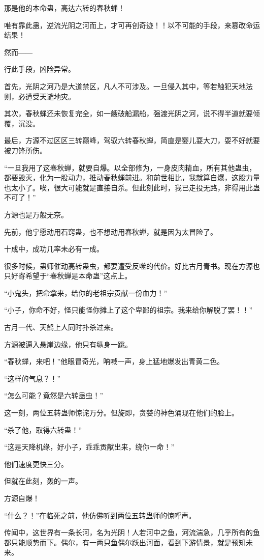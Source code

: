 \begin{this_body}
那是他的本命蛊，高达六转的春秋蝉！

唯有靠此蛊，逆流光阴之河而上，才可再创奇迹！！以不可能的手段，来篡改命运结果！

然而――

行此手段，凶险异常。

首先，光阴之河乃是大道禁区，凡人不可涉及。一旦侵入其中，等若触犯天地法则，必遭受天谴地灾。

其次，春秋蝉还未恢复完全，如一艘破船漏船，强渡光阴之河，说不得半道就要倾覆，沉没。

最后，方源不过区区三转巅峰，驾驭六转春秋蝉，简直是婴儿耍大刀，耍不好就要被刀锋所伤。

“一旦我用了这春秋蝉，就要自爆。以全部修为，一身皮肉精血，所有其他蛊虫，都要毁灭，化为一股动力，推动春秋蝉前进。和前世相比，我就算自爆，这股力量也太小了。唉，很大可能就是直接自杀。但此刻此时，我已走投无路，非得用此蛊不可了！”

方源也是万般无奈。

先前，他宁愿动用石窍蛊，也不想动用春秋蝉，就是因为太冒险了。

十成中，成功几率未必有一成。

很多时候，蛊师催动高转蛊虫，都要遭受反噬的代价。好比古月青书。现在方源也只好寄希望于“春秋蝉是本命蛊”这点上。

“小鬼头，把命拿来，给你的老祖宗贡献一份血力！”

“小子，你命不好，怪只能怪你摊上了这个卑鄙的祖宗。我来给你解脱了罢！！”

古月一代、天鹤上人同时扑杀过来。

方源被逼入悬崖边缘，他只有纵身一跳。

“春秋蝉，来吧！”他眼冒奇光，呐喊一声，身上猛地爆发出青黄二色。

“这样的气息？！”

“怎么可能？竟然是六转蛊虫！”

这一刻，两位五转蛊师惊诧万分。但旋即，贪婪的神色涌现在他们的脸上。

“杀了他，取得六转蛊！”

“这是天降机缘，好小子，乖乖贡献出来，绕你一命！”

他们速度更快三分。

但就在此刻，轰的一声。

方源自爆！

“什么？！”在临死之前，他仿佛听到两位五转蛊师的惊呼声。

传闻中，这世界有一条长河，名为光阴！人若河中之鱼，河流湍急，几乎所有的鱼都只能顺势而下。偶尔，有一两只鱼偶尔跃出河面，看到下游情景，就是预知未来。


\end{this_body}
